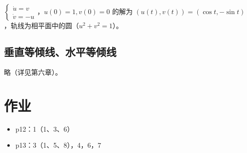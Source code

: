 \begin{example}
$\begin{cases} \dot{u} = v \\ \dot{v} = -u \end{cases}$，$u(0) = 1, v(0) = 0$ 的解为 $(u(t), v(t)) = (\cos t, -\sin t)$，轨线为相平面中的圆（$u^2 + v^2 = 1$）。
\end{example}

\subsection{垂直等倾线、水平等倾线}

略（详见第六章）。

\section*{作业}

\begin{itemize}
    \item p12：1（1、3、6）
    \item p13：3（1、5、8），4，6，7
\end{itemize}
